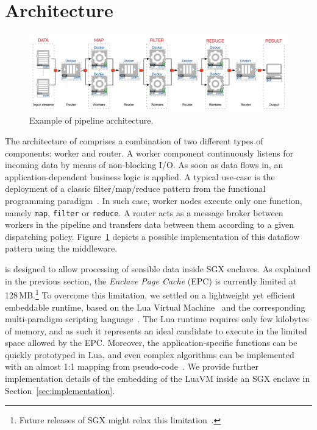\section{Architecture}
\label{sec:architecture}
\begin{figure}[!t]
  \centering
  \includegraphics[scale=0.5]{images/architecture_pipeline}
  \caption{Example of \SYS pipeline architecture.}
  \label{fig:architecture_pipeline}
\end{figure}


The architecture of \SYS{} comprises a combination of two different types of components: \textsf{worker} and \textsf{router}.
A worker component continuously listens for incoming data by means of non-blocking I/O.
As soon as data flows in, an application-dependent business logic is applied.
A typical use-case is the deployment of a classic filter/map/reduce pattern from the functional programming paradigm~\cite{bird_introduction_1988}.
In such case, worker nodes execute only one function, namely \texttt{map}, \texttt{filter} or \texttt{reduce}.
A router acts as a message broker between workers in the pipeline and transfers data between them according to a given dispatching policy.
Figure~\ref{fig:architecture_pipeline} depicts a possible implementation of this dataflow pattern using the \SYS middleware.

\SYS is designed to allow processing of sensible data inside SGX enclaves.
As explained in the previous section, the \emph{Enclave Page Cache} (EPC) is currently limited at 128\,MB.\footnote{Future releases of SGX might relax this limitation~\cite{mckeen2016intel}.}
To overcome this limitation, we settled on a lightweight yet efficient embeddable runtime, based on the Lua Virtual Machine~\cite{ierusalimschy_luaextensible_1996} and the corresponding multi-paradigm scripting language~\cite{lualang}.
The Lua runtime requires only few kilobytes of memory, and as such it represents an ideal candidate to execute in the limited space allowed by the EPC.
Moreover, the application-specific functions can be quickly prototyped in Lua, and even complex algorithms can be implemented with an almost 1:1 mapping from pseudo-code~\cite{leonini2009splay}.
We provide further implementation details of the embedding of the LuaVM inside an SGX enclave in Section~\ref{sec:implementation}.

